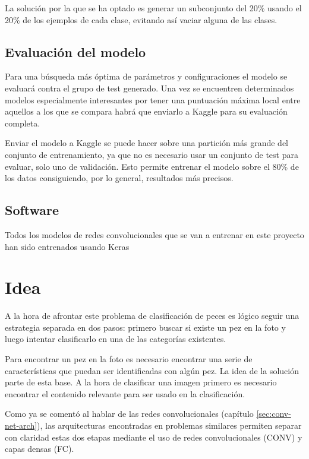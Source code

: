 La solución por la que se ha optado es generar un subconjunto del 20\% usando el 20\% de los ejemplos de cada clase, evitando así vaciar alguna de las clases.

\subsection{Evaluación del modelo}

Para una búsqueda más óptima de parámetros y configuraciones el modelo se evaluará contra el grupo de test generado. Una vez se encuentren determinados modelos especialmente interesantes por tener una puntuación máxima local entre aquellos a los que se compara habrá que enviarlo a Kaggle para su evaluación completa.

Enviar el modelo a Kaggle se puede hacer sobre una partición más grande del conjunto de entrenamiento, ya que no es necesario usar un conjunto de test para evaluar, solo uno de validación. Esto permite entrenar el modelo sobre el 80\% de los datos consiguiendo, por lo general, resultados más precisos.

\subsection{Software}

Todos los modelos de redes convolucionales que se van a entrenar en este proyecto han sido entrenados usando Keras
\section{Idea}
A la hora de afrontar este problema de clasificación de peces es lógico
seguir una estrategia separada en dos pasos: primero buscar si
existe un pez en la foto y luego intentar clasificarlo en una de las 
categorías existentes. 

Para encontrar un pez en la foto es necesario encontrar una serie de
características que puedan ser identificadas con algún pez. La idea de 
la solución parte de esta base. A la hora de clasificar una imagen
primero es necesario encontrar el contenido relevante para ser usado
en la clasificación.

Como ya se comentó al hablar de las redes convolucionales (capítulo \ref{sec:conv-net-arch}),
las arquitecturas encontradas en problemas similares \parencite{krizhevsky2012imagenet}
permiten separar con claridad estas dos etapas mediante el uso de redes convolucionales (CONV) y capas densas (FC).

